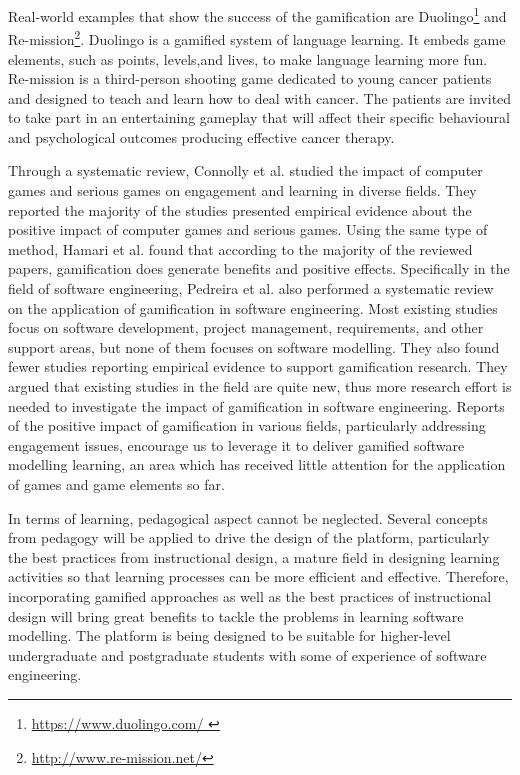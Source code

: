 \documentclass[12pt, a4paper]{report} \usepackage[titletoc]{appendix}
\begin{document}
Real-world examples that show the success of the gamification are Duolingo\footnote{\url{https://www.duolingo.com/ }} and Re-mission\footnote{\url{http://www.re-mission.net/}}. Duolingo is a gamified system of language learning. It embeds game elements, such as points, levels,and lives, to make language learning more fun. Re-mission is a third-person shooting game dedicated to young cancer patients and designed to teach and learn how to deal with cancer. The patients are invited to take part in an entertaining gameplay that will affect their specific behavioural and psychological outcomes producing effective cancer therapy.
 
Through a systematic review, Connolly et al. \cite{connolly2012systematic} studied the impact of computer games and serious games on engagement and learning in diverse fields. They reported the majority of the studies presented empirical evidence about the positive impact of computer games and serious games. Using the same type of method, Hamari et al. \cite{hamari2014does} found that according to the majority of the reviewed papers, gamification does generate benefits and positive effects. Specifically in the field of software engineering, Pedreira et al. \cite{Pedreira2015} also performed a systematic review on the application of gamification in software engineering. Most existing studies focus on software development, project management, requirements, and other support areas, but none of them focuses on software modelling. They also found fewer studies reporting empirical evidence to support gamification research. They argued that existing studies in the field are quite new, thus more research effort is needed to investigate the impact of gamification in software engineering. Reports of the positive impact of gamification in various fields, particularly addressing engagement issues, encourage us to leverage it to deliver gamified software modelling learning, an area which has received little attention for the application of games and game elements so far. 

In terms of learning, pedagogical aspect cannot be neglected. Several concepts from pedagogy will be applied to drive the design of the platform, particularly the best practices from instructional design, a mature field in designing learning activities so that learning processes can be more efficient and effective. Therefore, incorporating gamified approaches as well as the best practices of instructional design will bring great benefits to tackle the problems in learning software modelling. The platform is being designed to be suitable for higher-level undergraduate and postgraduate students with some of experience of software engineering. 
\end{document}
